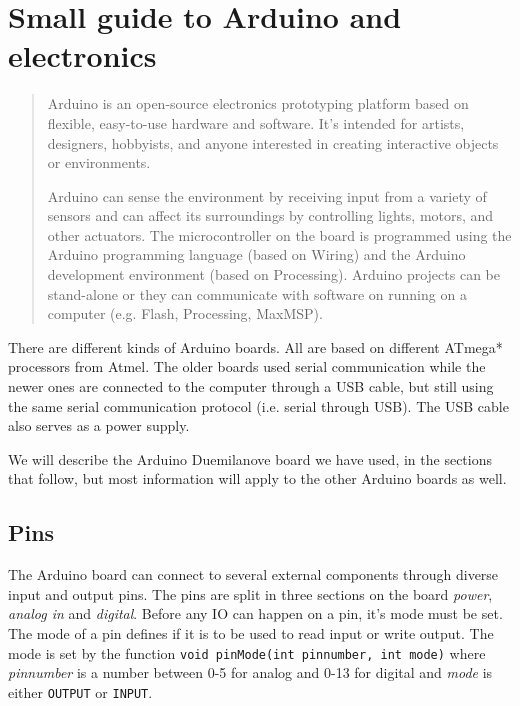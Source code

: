 \documentclass[a4paper,oneside, draft]{memoir}
\begin{document}



\appendix

\chapter{Small guide to Arduino and electronics}

\begin{quotation}
  Arduino is an open-source electronics prototyping platform based on
  flexible, easy-to-use hardware and software. It's intended for
  artists, designers, hobbyists, and anyone interested in creating
  interactive objects or environments.

  Arduino can sense the environment by receiving input from a variety
  of sensors and can affect its surroundings by controlling lights,
  motors, and other actuators. The microcontroller on the board is
  programmed using the Arduino programming language (based on Wiring)
  and the Arduino development environment (based on
  Processing). Arduino projects can be stand-alone or they can
  communicate with software on running on a computer (e.g. Flash,
  Processing, MaxMSP).
\end{quotation}



There are different kinds of Arduino boards. All are based on
different ATmega* processors from Atmel. The older boards used serial
communication while the newer ones are connected to the computer
through a USB cable, but still using the same serial communication
protocol (i.e. serial through USB). The USB cable also serves as a
power supply.


We will describe the Arduino Duemilanove board we have used, in the
sections that follow, but most information will apply to
the other Arduino boards as well.

\section{Pins}
The Arduino board can connect to several external components through
diverse input and output pins. The pins are split in three sections on
the board \textit{power}, \textit{analog in} and
\textit{digital}. Before any IO can happen on a pin, it's mode must be
set. The mode of a pin defines if it is to be used to read input or
write output. The mode is set by the function \texttt{void pinMode(int
  pinnumber, int mode)} where \textit{pinnumber} is a number between
0-5 for analog and 0-13 for digital and \textit{mode} is either
\texttt{OUTPUT} or \texttt{INPUT}.
\end{document}
